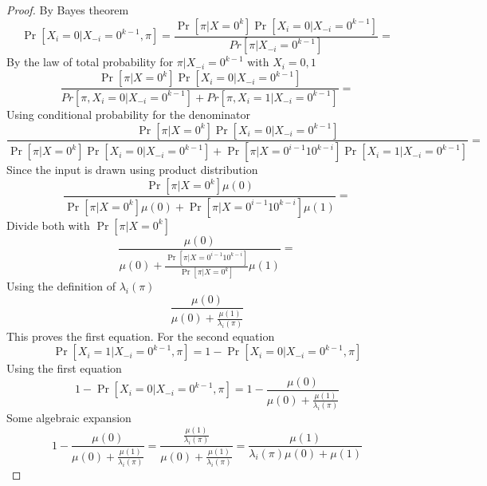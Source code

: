 \documentclass{article}
\theoremstyle{plain}
\begin{document}
\begin{proof}
    By Bayes  theorem
    \begin{equation*}
        \Pr[X_i = 0 | X_{-i}=0^{k-1}, \pi] = \frac{\Pr[\pi | X=0^k]\Pr[X_i=0|X_{-i}=0^{k-1}]}{Pr[\pi|X_{-i} = 0^{k-1}]} = 
    \end{equation*}
    By the law of total probability for $\pi|X_{-i} = 0^{k-1}$ with $X_i=0,1$
    \begin{equation*}
        \frac{\Pr[\pi | X=0^k]\Pr[X_i=0|X_{-i}=0^{k-1}]}{Pr[\pi,X_i=0|X_{-i} = 0^{k-1}] + Pr[\pi,X_i=1|X_{-i} = 0^{k-1}]} = 
    \end{equation*}
    Using conditional probability for the denominator
    \begin{equation*}
        \frac{\Pr[\pi | X=0^k]\Pr[X_i=0|X_{-i}=0^{k-1}]}{\Pr[\pi | X=0^k]\Pr[X_i=0|X_{-i}=0^{k-1}] + \Pr[\pi | X=0^{i-1}10^{k-i}]\Pr[X_i=1|X_{-i}=0^{k-1}]} =
    \end{equation*}
    Since the input is drawn using product distribution
    \begin{equation*}
        \frac{\Pr[\pi | X=0^k]\mu(0)}{\Pr[\pi | X=0^k]\mu(0) + \Pr[\pi | X=0^{i-1}10^{k-i}]\mu(1)} = 
    \end{equation*}
    Divide both with $\Pr[\pi | X=0^k]$
    \begin{equation*}
        \frac{\mu(0)}{\mu(0) + \frac{\Pr[\pi | X=0^{i-1}10^{k-i}]}{\Pr[\pi | X=0^k]}\mu(1)} = 
    \end{equation*}
    Using the definition of $\lambda_i(\pi)$
    \begin{equation*}
        \frac{\mu(0)}{\mu(0) + \frac{\mu(1)}{\lambda_i(\pi)}}
    \end{equation*}
    This proves the first equation.
    For the second equation
    \begin{equation*}
        \Pr[X_i = 1 | X_{-i}=0^{k-1}, \pi] = 1 - \Pr[X_i = 0 | X_{-i}=0^{k-1}, \pi]
    \end{equation*}
    Using the first equation
    \begin{equation*}
        1 - \Pr[X_i = 0 | X_{-i}=0^{k-1}, \pi] = 1 - \frac{\mu(0)}{\mu(0) + \frac{\mu(1)}{\lambda_i(\pi)}}
    \end{equation*}
    Some algebraic expansion
    \begin{equation*}
        1 - \frac{\mu(0)}{\mu(0) + \frac{\mu(1)}{\lambda_i(\pi)}} = \frac{\frac{\mu(1)}{\lambda_i(\pi)}}{\mu(0) + \frac{\mu(1)}{\lambda_i(\pi)}} = \frac{\mu(1)}{\lambda_i(\pi)\mu(0) + \mu(1)}
    \end{equation*}
\end{proof}
\end{document}
